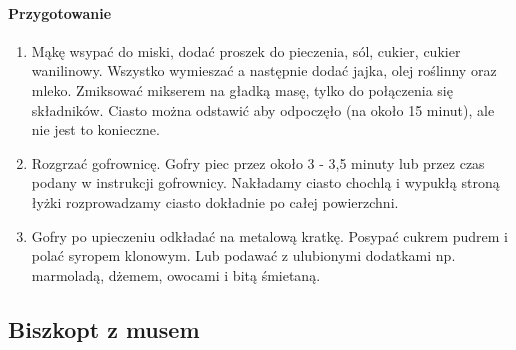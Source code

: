 \documentclass{article}
\begin{document}
    \paragraph{Przygotowanie}
    \begin{enumerate}
        \item Mąkę wsypać do miski, dodać proszek do pieczenia, sól, cukier,
            cukier wanilinowy. Wszystko wymieszać a następnie dodać jajka, olej
            roślinny oraz mleko. Zmiksować mikserem na gładką masę, tylko do
            połączenia się składników. Ciasto można odstawić aby odpoczęło (na
            około 15 minut), ale nie jest to konieczne.
        \item Rozgrzać gofrownicę. Gofry piec przez około 3 - 3,5 minuty lub
            przez czas podany w instrukcji gofrownicy. Nakładamy ciasto chochlą
            i wypukłą stroną łyżki rozprowadzamy ciasto dokładnie po całej
            powierzchni.
        \item Gofry po upieczeniu odkładać na metalową kratkę. Posypać cukrem
            pudrem i polać syropem klonowym. Lub podawać z ulubionymi dodatkami
            np. marmoladą, dżemem, owocami i bitą śmietaną.
    \end{enumerate}
    \newpage

    \subsection{Biszkopt z musem}
    \bigskip
\end{document}
